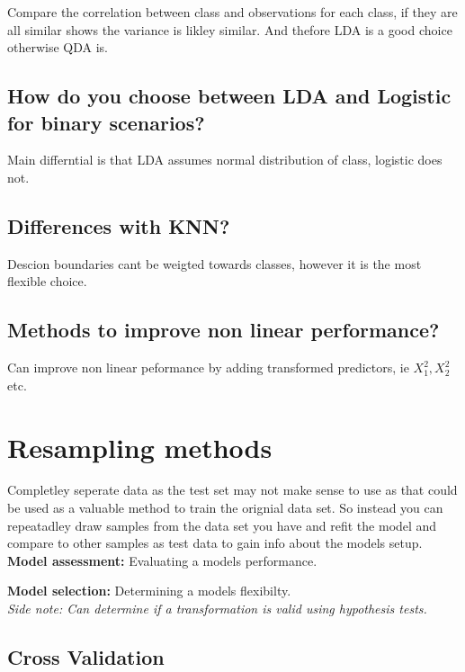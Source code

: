\documentclass[11pt]{scrartcl} %
\begin{document}
Compare the correlation between class and observations for each class, if they are all similar shows
the variance is likley similar. And thefore LDA is a good choice otherwise QDA is.

\subsection{How do you choose between LDA and Logistic for binary scenarios?}

Main differntial is that LDA assumes normal distribution of class, logistic does not.

\subsection{Differences with KNN?}

Descion boundaries cant be weigted towards classes, however it is the most flexible choice.

\subsection{Methods to improve non linear performance?}

Can improve non linear peformance by adding transformed predictors, ie \(X_1^2,X_2^2\) etc.

\section{Resampling methods}

Completley seperate data as the test set may not make sense to use as that could be used as
a valuable method to train the orignial data set. So instead you can repeatadley draw samples
from the data set you have and refit the model and compare to other samples as test data to gain
info about the models setup.\\

\textbf{Model assessment:} Evaluating a models performance.

\textbf{Model selection:} Determining a models flexibilty.\\

\textit{Side note: Can determine if a transformation is valid using hypothesis tests.}

\subsection{Cross Validation}
\end{document}
